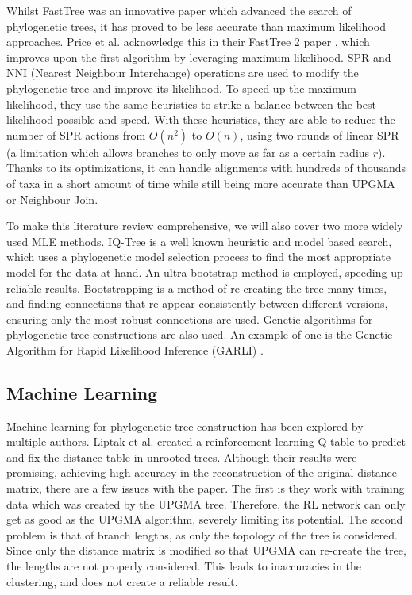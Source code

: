 \documentclass{mpaper}
\begin{document}
Whilst FastTree was an innovative paper which advanced the search of phylogenetic trees, it has proved to be less accurate than maximum likelihood approaches. Price et al. acknowledge this in their FastTree 2 paper \cite{fasttree2}, which improves upon the first algorithm by leveraging maximum likelihood. SPR and NNI (Nearest Neighbour Interchange) operations are used to modify the phylogenetic tree and improve its likelihood. To speed up the maximum likelihood, they use the same heuristics to strike a balance between the best likelihood possible and speed. With these heuristics, they are able to reduce the number of SPR actions from $O(n^2)$ to $O(n)$, using two rounds of linear SPR (a limitation which allows branches to only move as far as a certain radius $r$). Thanks to its optimizations, it can handle alignments with hundreds of thousands of taxa in a short amount of time while still being more accurate than UPGMA or Neighbour Join.

To make this literature review comprehensive, we will also cover two more widely used MLE methods. IQ-Tree \cite{nguyen2015iq} is a well known heuristic and model based search, which uses a phylogenetic model selection process to find the most appropriate model for the data at hand. An ultra-bootstrap method is employed, speeding up reliable results. Bootstrapping is a method of re-creating the tree many times, and finding connections that re-appear consistently between different versions, ensuring only the most robust connections are used. Genetic algorithms for phylogenetic tree constructions are also used. An example of one is the Genetic Algorithm for Rapid Likelihood Inference (GARLI) \cite{Evolution_and_Genomics_2016}. 

\subsection{Machine Learning}

Machine learning for phylogenetic tree construction has been explored by multiple authors. Liptak et al. \cite{liptak2021constructing} created a reinforcement learning Q-table to predict and fix the distance table in unrooted trees. Although their results were promising, achieving high accuracy in the reconstruction of the original distance matrix, there are a few issues with the paper. The first is they work with training data which was created by the UPGMA tree. Therefore, the RL network can only get as good as the UPGMA algorithm, severely limiting its potential. The second problem is that of branch lengths, as only the topology of the tree is considered. Since only the distance matrix is modified so that UPGMA can re-create the tree, the lengths are not properly considered. This leads to inaccuracies in the clustering, and does not create a reliable result. 
\end{document}

